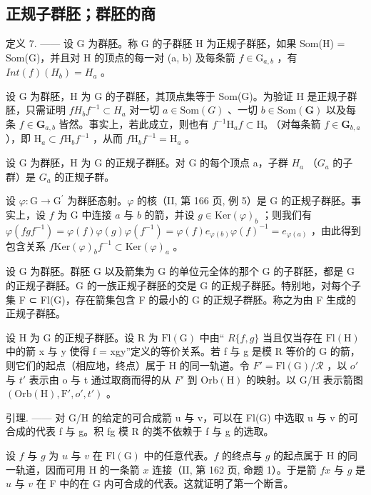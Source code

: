 \subsection{正规子群胚；群胚的商}

定义 7. —— 设 G 为群胚。称 G 的子群胚 H 为正规子群胚，如果 Som(H) = Som(G)，并且对 H 的顶点的每一对 (a, b) 及每条箭 \(f \in \mathrm{G}_{a,b}\) ，有 \(Int(f)(H_b) = H_a\) 。

设 G 为群胚，H 为 G 的子群胚，其顶点集等于 Som(G)。为验证 H 是正规子群胚，只需证明 \(fH_{b}f^{-1} \subset H_{a}\) 对一切 \(a \in \text{Som}(G)\) 、一切 \(b \in \text{Som}(\mathbf{G})\) 以及每条 \(f \in \mathbf{G}_{a,b}\) 皆然。事实上，若此成立，则也有 \(f^{-1}\mathrm{H}_a f \subset \mathrm{H}_b\) （对每条箭 \(f \in \mathbf{G}_{b,a}\) ），即 \(\mathrm{H}_a \subset f\mathrm{H}_b f^{-1}\) ，从而 \(f\mathrm{H}_b f^{-1} = \mathrm{H}_a\) 。

设 G 为群胚，H 为 G 的正规子群胚。对 G 的每个顶点 a，子群 \(H_{a}\) （\(G_{a}\) 的子群）是 \(G_{a}\) 的正规子群。

设 \(\varphi\colon\mathrm{G}\to\mathrm{G}^{\prime}\) 为群胚态射。\(\varphi\) 的核（II, 第 166 页, 例 5）是 G 的正规子群胚。事实上，设 \(f\) 为 G 中连接 \(a\) 与 \(b\) 的箭，并设 \(g\in\mathrm{Ker}(\varphi)_{b}\) ；则我们有 \(\varphi(fgf^{-1})=\varphi(f)\varphi(g)\varphi(f^{-1})=\varphi(f)e_{\varphi(b)}\varphi(f)^{-1}=e_{\varphi(a)}\) ，由此得到包含关系 \(f\mathrm{Ker}(\varphi)_{b}f^{-1}\subset\mathrm{Ker}(\varphi)_{a}\) 。

设 G 为群胚。群胚 G 以及箭集为 G 的单位元全体的那个 G 的子群胚，都是 G 的正规子群胚。G 的一族正规子群胚的交是 G 的正规子群胚。特别地，对每个子集 F ⊂ Fl(G)，存在箭集包含 F 的最小的 G 的正规子群胚。称之为由 F 生成的正规子群胚。

设 H 为 G 的正规子群胚。设 R 为 \(\mathrm{Fl}(\mathrm{G})\) 中由“ \(R\{f,g\}\) 当且仅当存在 \(\mathrm{Fl}(\mathrm{H})\) 中的箭 x 与 y 使得 f = xgy”定义的等价关系。若 f 与 g 是模 R 等价的 G 的箭，则它们的起点（相应地，终点）属于 H 的同一轨道。令 \(F' = \mathrm{Fl}(\mathrm{G}) / \mathcal{R}\) ，以 \(o'\) 与 \(t'\) 表示由 o 与 t 通过取商而得的从 \(F'\) 到 \(\mathrm{Orb}(\mathrm{H})\) 的映射。以 G/H 表示箭图 \((\mathrm{Orb}(\mathrm{H}), \mathrm{F}', o', t')\) 。

引理. —— 对 G/H 的给定的可合成箭 u 与 v，可以在 Fl(G) 中选取 u 与 v 的可合成的代表 f 与 g。积 fg 模 R 的类不依赖于 f 与 g 的选取。

设 \(f\) 与 \(g\) 为 \(u\) 与 \(v\) 在 \(\mathrm{Fl(G)}\) 中的任意代表。\(f\) 的终点与 \(g\) 的起点属于 H 的同一轨道，因而可用 H 的一条箭 \(x\) 连接（II, 第 162 页, 命题 1）。于是箭 \(fx\) 与 \(g\) 是 \(u\) 与 \(v\) 在 F 中的在 G 内可合成的代表。这就证明了第一个断言。

